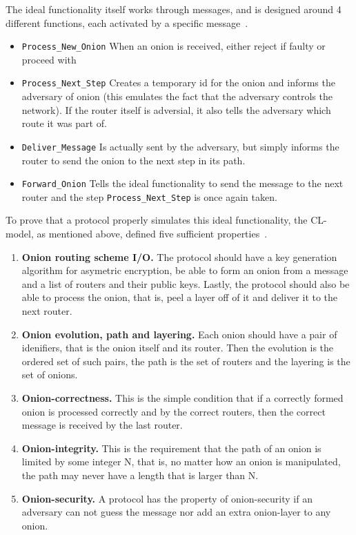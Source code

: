 The ideal functionality itself works through messages, and is
designed around 4 different functions, each activated by a specific
message~\cite{CL-model}.
\begin{itemize}
  \item{{\tt Process_New_Onion} When an onion is received, either
    reject if faulty or proceed with}
  \item{{\tt Process_Next_Step} Creates a temporary id for the onion
    and informs the adversary of onion (this emulates the fact that
    the adversary controls the network). If the router itself is
    adversial, it also tells the adversary which route it was part
    of. }
  \item{{\tt Deliver_Message} Is actually sent by the adversary, but
    simply informs the router to send the onion to the next step in
    its path.}
  \item{{\tt Forward_Onion} Tells the ideal functionality to send the
    message to the next router and the step {\tt Process_Next_Step} is
    once again taken.}
\end{itemize}

To prove that a protocol properly simulates this ideal functionality,
the CL-model, as mentioned above, defined five sufficient properties~\cite{CL-model}.

\begin{enumerate}
  \item{{\bf Onion routing scheme I/O.} The protocol should have a key
  generation algorithm for asymetric encryption, be able to form an
  onion from a message and a list of routers and their public
  keys. Lastly, the protocol should also be able to process the onion,
  that is, peel a layer off of it and deliver it to the next router.}

  \item{{\bf Onion evolution, path and layering.} Each onion should
    have a pair of idenifiers, that is the onion itself and its
    router. Then the evolution is the ordered set of such pairs, the path is
    the set of routers and the layering is the set of onions.}

  \item{{\bf Onion-correctness.} This is the simple condition that if a
  correctly formed onion is processed correctly and by the correct
  routers, then the correct message is received by the last router.}

  \item{{\bf Onion-integrity.} This is the requirement that the path of
  an onion is limited by some integer N, that is, no matter how an
  onion is manipulated, the path may never have a length that is
  larger than N.}

  \item{{\bf Onion-security.} A protocol has the property of
    onion-security if an adversary can not guess the message nor add
    an extra onion-layer to any onion.}
\end{enumerate}


